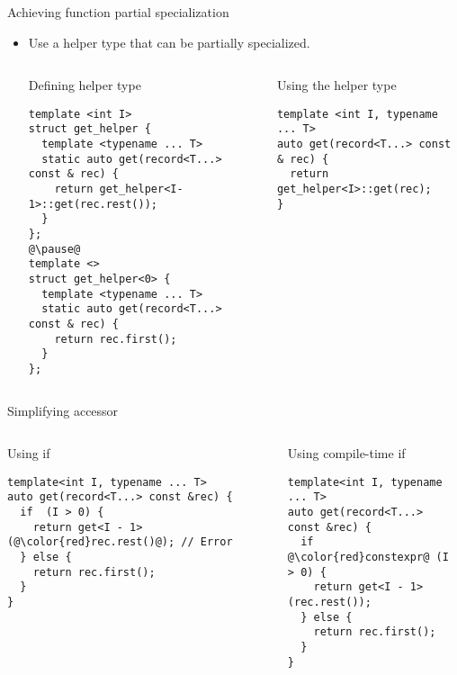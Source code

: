 \begin{frame}[t,fragile]{Achieving function partial specialization}
\begin{itemize}
  \item Use a helper type that can be partially specialized.

\begin{columns}[T]

\begin{block}{Defining helper type}
\begin{lstlisting}[escapechar=@]
template <int I>
struct get_helper {
  template <typename ... T>
  static auto get(record<T...> const & rec) {
    return get_helper<I-1>::get(rec.rest());
  }
};
@\pause@
template <>
struct get_helper<0> {
  template <typename ... T>
  static auto get(record<T...> const & rec) {
    return rec.first();
  }
};
\end{lstlisting}
\end{block}

\pause
{}
\begin{block}{Using the helper type}
\begin{lstlisting}
template <int I, typename ... T>
auto get(record<T...> const & rec) {
  return get_helper<I>::get(rec);
}
\end{lstlisting}
\end{block}

\end{columns}

\end{itemize}
\end{frame}


\begin{frame}[t,fragile]{Simplifying accessor}
\begin{columns}[T]

\begin{block}{Using if}
\begin{lstlisting}[escapechar=@]
template<int I, typename ... T>
auto get(record<T...> const &rec) {
  if  (I > 0) {
    return get<I - 1>(@\color{red}rec.rest()@); // Error
  } else {
    return rec.first();
  }
}
\end{lstlisting}
\end{block}

\pause
{}
\begin{block}{Using compile-time if}
\begin{lstlisting}[escapechar=@]
template<int I, typename ... T>
auto get(record<T...> const &rec) {
  if @\color{red}constexpr@ (I > 0) {
    return get<I - 1>(rec.rest());
  } else {
    return rec.first();
  }
}
\end{lstlisting}
\end{block}
\end{columns}
\end{frame}
